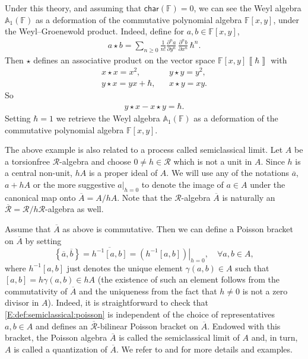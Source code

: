 \documentclass{commat}
\newcommand{\FF}{\mathbb{F}}
\newcommand{\wa}[1][1]{\mathbb{A}_{#1}}
\newcommand\chara{\mathsf {char}}
\newcommand{\barr}[1]{\overline{#1}}
\newcommand{\eval}[2]{\left. #1 \right|_{#2}}
\newcommand{\pb}[1]{\left\{ #1\right\}}
\newcommand{\formal}[1]{\left\llbracket #1\right\rrbracket}
\begin{document}
Under this theory, and assuming that $\chara(\FF)=0$, we can see the Weyl algebra $\wa(\FF)$ as a deformation of the commutative polynomial algebra $\FF[x,y]$, under the Weyl--Groenewold product. Indeed, define for $a, b\in\FF[x,y]$,
\begin{align}
	a\star b=\sum_{n\geq 0} \frac{1}{n!}\frac{\partial^n a}{\partial y^n}\,\frac{\partial^n b}{\partial x^n}\,\hbar^n.
\end{align}
Then $\star$ defines an associative product on the vector space $\FF[x,y]\!\!\formal{\hbar}$ with
\begin{eqnarray*}
	x\star x =x^2, && y\star y=y^2,\\
	y\star x=yx+\hbar, && x\star y=xy.
\end{eqnarray*}
So 
\begin{align*}
	y\star x-x\star y=\hbar.
\end{align*}
Setting $\hbar=1$ we retrieve the Weyl algebra $\wa(\FF)$ as a deformation of the commutative polynomial algebra $\FF[x, y]$.

The above example is also related to a process called semiclassical limit. Let $A$ be a torsionfree $\mathcal{R}$-algebra and choose $0\neq h\in\mathcal{R}$ which is not a unit in $A$. Since $h$ is a central non-unit, $hA$ is a proper ideal of $A$. We will use any of the notations $\barr a$, $a+hA$ or the more suggestive $\eval{a}{h=0}$ to denote the image of $a\in A$ under the canonical map onto $\barr A = A/hA$. Note that the $\mathcal{R}$-algebra $\barr A$ is naturally an $\barr{\mathcal{R}}=\mathcal{R}/h\mathcal{R}$-algebra as well.

Assume that $\barr A$ as above is commutative. Then we can define a Poisson bracket on $\barr A$ by setting
\begin{equation}\label{E:def:semiclassical:poisson}
	\pb{\barr a, \barr b}=\barr{h^{-1}[a, b]}=\eval{(h^{-1}[a, b])}{h=0}, \quad \forall a, b\in A,
\end{equation}
where $h^{-1}[a, b]$ just denotes the unique element $\gamma(a, b)\in A$ such that $[a, b]=h\gamma(a, b)\in hA$ (the existence of such an element follows from the commutativity of $\barr{A}$ and the uniqueness from the fact that $h\neq 0$ is not a zero divisor in $A$). Indeed, it is straightforward to check that \eqref{E:def:semiclassical:poisson} is independent of the choice of representatives $a, b\in A$ and defines an $\barr{\mathcal{R}}$-bilinear Poisson bracket on $\barr{A}$. Endowed with this bracket, the Poisson algebra $\barr{A}$ is called the semiclassical limit of $A$ and, in turn, $A$ is called a quantization of $\barr{A}$. We refer to \cite[III.5.4]{BG02} and \cite[Sec.\ 1.1.3]{fD11} for more details and examples.
\end{document}
